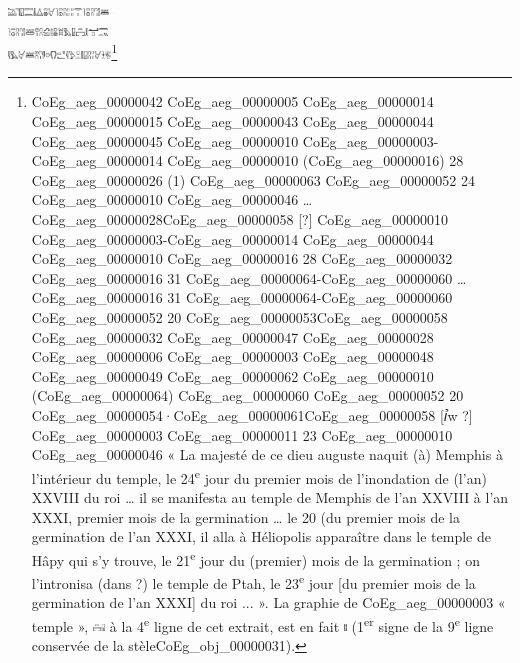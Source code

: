 \documentclass{book}
\begin{document}
{\begin{paracol}{2}
\includegraphics[height=6pt]{CoEg_Mariette_hiero_1857-04-01_7_2_3.png}\\
\includegraphics[height=6pt]{CoEg_Mariette_hiero_1857-04-01_7_2_4.png}\\
\includegraphics[height=6pt]{CoEg_Mariette_hiero_1857-04-01_7_2_5.png}\footnote{\foreignlanguage{translit}{\Gls{CoEg_aeg_00000042} \gls{CoEg_aeg_00000005} \gls{CoEg_aeg_00000014} \gls{CoEg_aeg_00000015} \gls{CoEg_aeg_00000043} \gls{CoEg_aeg_00000044} \gls{CoEg_aeg_00000045} \gls{CoEg_aeg_00000010} \gls{CoEg_aeg_00000003}-\gls{CoEg_aeg_00000014} \gls{CoEg_aeg_00000010} (\gls{CoEg_aeg_00000016}) 28 \gls{CoEg_aeg_00000026} (1) \gls{CoEg_aeg_00000063} \gls{CoEg_aeg_00000052} 24 \gls{CoEg_aeg_00000010} \gls{CoEg_aeg_00000046}} … \foreignlanguage{translit}{\gls{CoEg_aeg_00000028}\gls{CoEg_aeg_00000058} [?] \gls{CoEg_aeg_00000010} \gls{CoEg_aeg_00000003}-\gls{CoEg_aeg_00000014} \gls{CoEg_aeg_00000044} \gls{CoEg_aeg_00000010} \gls{CoEg_aeg_00000016} 28 \gls{CoEg_aeg_00000032} \gls{CoEg_aeg_00000016} 31 \gls{CoEg_aeg_00000064}-\gls{CoEg_aeg_00000060}} … \foreignlanguage{translit}{\gls{CoEg_aeg_00000016} 31 \gls{CoEg_aeg_00000064}-\gls{CoEg_aeg_00000060} \gls{CoEg_aeg_00000052} 20 \gls{CoEg_aeg_00000053}\gls{CoEg_aeg_00000058} \gls{CoEg_aeg_00000032} \gls{CoEg_aeg_00000047} \gls{CoEg_aeg_00000028} \gls{CoEg_aeg_00000006} \gls{CoEg_aeg_00000003} \gls{CoEg_aeg_00000048} \gls{CoEg_aeg_00000049} \gls{CoEg_aeg_00000062} \gls{CoEg_aeg_00000010} (\gls{CoEg_aeg_00000064}) \gls{CoEg_aeg_00000060} \gls{CoEg_aeg_00000052} 20 \gls{CoEg_aeg_00000054}·\gls{CoEg_aeg_00000061}\gls{CoEg_aeg_00000058} [ꞽw ?] \gls{CoEg_aeg_00000003} \gls{CoEg_aeg_00000011} 23 \gls{CoEg_aeg_00000010} \gls{CoEg_aeg_00000046}} « La majesté de ce dieu auguste naquit (à) Memphis à l’intérieur du temple, le 24\textsuperscript{e} jour du premier mois de l'inondation de (l'an) XXVIII du roi … il se manifesta au temple de Memphis de l’an XXVIII à l’an XXXI, premier mois de la germination … le 20 (du premier mois de la germination de l'an XXXI, il alla à Héliopolis apparaître dans le temple de Hâpy qui s’y trouve, le 21\textsuperscript{e} jour du (premier) mois de la germination ; on l’intronisa (dans ?) le temple de Ptah, le 23\textsuperscript{e} jour [du premier mois de la germination de l'an XXXI] du roi ... ». La graphie de \foreignlanguage{translit}{\gls{CoEg_aeg_00000003}} « temple », \includegraphics[height=6pt]{CoEg_Mariette_hiero_1857-04-01_7_2_note_2.png} à la 4\textsuperscript{e} ligne de cet extrait, est en fait \includegraphics[height=6pt]{CoEg_Mariette_hiero_1857-04-01_7_2_note_1.png} (1\textsuperscript{er} signe de la 9\textsuperscript{e} ligne conservée de la stèle\gls{CoEg_obj_00000031}).}\\

\end{paracol}}
\end{document}
